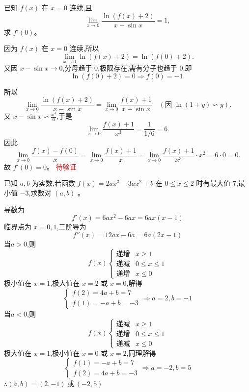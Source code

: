 \begin{questions}
\question
已知 \( f(x) \) 在 \( x = 0 \) 连续,且
\[
\lim_{x \to 0} \frac{\ln (f(x) + 2)}{x - \sin x} = 1,
\]
求 \( f'(0) \)。
    
\begin{solution}
    因为 \( f(x) \) 在 \( x = 0 \) 连续,所以
    \[
    \lim_{x \to 0} \ln(f(x)+2) = \ln(f(0)+2).
    \]
    又因 \( x - \sin x \to 0 \),分母趋于 0,极限存在,需有分子也趋于 0,即
    \[
    \ln(f(0)+2) = 0 \Rightarrow f(0) = -1.
    \]
    
    所以
    \[
    \lim_{x \to 0} \frac{\ln(f(x)+2)}{x - \sin x}
    = \lim_{x \to 0} \frac{f(x)+1}{x - \sin x} \quad (\text{因 } \ln(1 + y) \backsim y).
    \]
    又 \( x - \sin x \backsim \frac{x^3}{6} \),于是
    \[
    \lim_{x \to 0} \frac{f(x)+1}{x^3} = \frac{1}{1/6} = 6.
    \]
    因此
    \[
    \lim_{x \to 0} \frac{f(x) - f(0)}{x} = \lim_{x \to 0} \frac{f(x)+1}{x} = \lim_{x \to 0} \frac{f(x)+1}{x^3} \cdot x^2 = 6 \cdot 0 = 0.
    \]
    故 \( f'(0) = \boxed{0} \)。
    \textcolor{red}{待验证}
\end{solution}

    \question 已知 $a,b$ 为实数,若函数 $f(x) = 2ax^{3} - 3ax^{2} + b$ 在 $0 \le x \le 2$ 时有最大值 $7$,最小值 $-3$,求数对 $(a,b)$ 。
    \begin{solution}
        导数为
        \[
        f'(x) = 6ax^2 - 6ax = 6ax(x-1)
        \]
        临界点为 $x = 0, 1$,二阶导为
        \[
        f''(x) = 12ax - 6a = 6a(2x - 1)
        \]
        当$a > 0$,则
        \[
        f(x)\begin{cases}
        \text{递增} & x \ge 1 \\
        \text{递减} & 0 \le x \le 1 \\
        \text{递增} & x \le 0
        \end{cases}
        \]
        极小值在 $x = 1$,极大值在 $x = 2$ 或 $x = 0$,解得
        \[
        \begin{cases}
        f(2) = 4a + b = 7 \\
        f(1) = -a + b = -3
        \end{cases}
        \Rightarrow a = 2, b = -1
        \]
        当$a < 0$,则
        \[
        f(x)\begin{cases}
        \text{递减} & x \ge 1 \\
        \text{递增} & 0 \le x \le 1 \\
        \text{递减} & x \le 0
        \end{cases}
        \]
        极大值在 $x = 1$,极小值在 $x = 0$ 或 $x = 2$,同理解得
        \[
        \begin{cases}
        f(1) = -a + b = 7 \\
        f(2) = 4a + b = -3
        \end{cases}
        \Rightarrow a = -2,b = 5
        \]
        $\therefore (a, b) = (2, -1) \ \text{或} \ (-2, 5)$
    \end{solution}


\end{questions}
